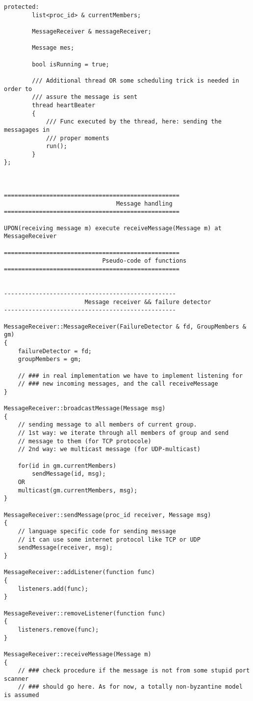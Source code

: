 \begin{lstlisting}[frame=lines,caption=Pseudocode of Paxos algorithm]
	protected:
		list<proc_id> & currentMembers;
		
		MessageReceiver & messageReceiver;
		
		Message mes;
		
		bool isRunning = true;
		
		/// Additional thread OR some scheduling trick is needed in order to
		/// assure the message is sent
		thread heartBeater
		{
			/// Func executed by the thread, here: sending the messagages in
			/// proper moments
			run();
		}
};



==================================================
                                Message handling
==================================================

UPON(receiving message m) execute receiveMessage(Message m) at MessageReceiver

==================================================
                            Pseudo-code of functions
==================================================


-------------------------------------------------
                       Message receiver && failure detector
-------------------------------------------------

MessageReceiver::MessageReceiver(FailureDetector & fd, GroupMembers & gm)
{
	failureDetector = fd;
	groupMembers = gm;
	
	// ### in real implementation we have to implement listening for 
	// ### new incoming messages, and the call receiveMessage
}

MessageReceiver::broadcastMessage(Message msg)
{
	// sending message to all members of current group.
	// 1st way: we iterate through all members of group and send
	// message to them (for TCP protocole)
	// 2nd way: we multicast message (for UDP-multicast)
	
	for(id in gm.currentMembers)
		sendMessage(id, msg);
	OR
	multicast(gm.currentMembers, msg);
}

MessageReceiver::sendMessage(proc_id receiver, Message msg)
{
	// language specific code for sending message
	// it can use some internet protocol like TCP or UDP
	sendMessage(receiver, msg);
}

MessageReceiver::addListener(function func)
{
	listeners.add(func);
}

MessageReveiver::removeListener(function func)
{
	listeners.remove(func);
}
			   
MessageReceiver::receiveMessage(Message m)
{
	// ### check procedure if the message is not from some stupid port scanner
	// ### should go here. As for now, a totally non-byzantine model is assumed



\end{lstlisting}
